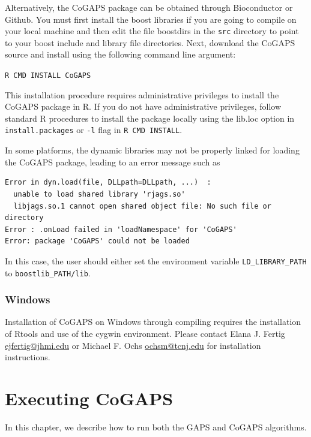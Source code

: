 \documentclass{report}
\begin{document}
\par Alternatively, the CoGAPS package can be obtained through Bioconductor or Github.  You must first install the boost libraries if you are going to compile on your local machine and then edit the file boostdirs in the \texttt{src} directory to point to your boost include and library file directories.  Next, download the CoGAPS source and install using the following command line argument:
\par \noindent \texttt{R CMD INSTALL CoGAPS}

\par This installation procedure requires administrative privileges to install the CoGAPS package in R.  If you do not have administrative privileges, follow standard R procedures to install the package locally using the lib.loc option in \texttt{install.packages} or \texttt{-l} flag in \texttt{R CMD INSTALL}.

\par In some platforms, the dynamic libraries may not be properly linked for loading the CoGAPS package, leading to an error message such as
\begin{verbatim}
Error in dyn.load(file, DLLpath=DLLpath, ...)  :
  unable to load shared library 'rjags.so'
  libjags.so.1 cannot open shared object file: No such file or directory
Error : .onLoad failed in 'loadNamespace' for 'CoGAPS'
Error: package 'CoGAPS' could not be loaded
\end{verbatim}
In this case, the user should either set the environment variable \texttt{LD\_LIBRARY\_PATH} to \texttt{boostlib\_PATH/lib}.

\subsection{Windows}

\par Installation of CoGAPS on Windows through compiling requires the installation of Rtools and use of the cygwin environment.  Please contact Elana J. Fertig \url{ejfertig@jhmi.edu} or Michael F. Ochs \url{ochsm@tcnj.edu} for installation instructions. 

\chapter{Executing CoGAPS}

\par In this chapter, we describe how to run both the GAPS and CoGAPS algorithms.  
\end{document}
